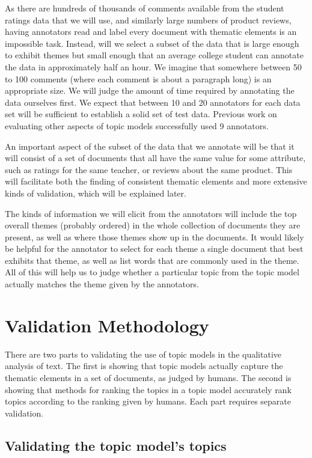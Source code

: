 \documentclass[onecolumn, 11pt]{article}
\begin{document}
As there are hundreds of thousands of comments available from the student
ratings data that we will use, and similarly large numbers of product reviews,
having annotators read and label every document with thematic elements is an
impossible task.  Instead, will we select a subset of the data that is large
enough to exhibit themes but small enough that an average college student can
annotate the data in approximately half an hour.  We imagine that somewhere
between 50 to 100 comments (where each comment is about a paragraph long) is an
appropriate size.  We will judge the amount of time required by annotating the
data ourselves first.  We expect that between 10 and 20 annotators for each
data set will be sufficient to establish a solid set of test data.  Previous
work on evaluating other aspects of topic models successfully used 9
annotators.  

An important aspect of the subset of the data that we annotate will be that it
will consist of a set of documents that all have the same value for some
attribute, such as ratings for the same teacher, or reviews about the same
product.  This will facilitate both the finding of consistent thematic elements
and more extensive kinds of validation, which will be explained later.

The kinds of information we will elicit from the annotators will include the
top overall themes (probably ordered) in the whole collection of documents they
are present, as well as where those themes show up in the documents.  It would
likely be helpful for the annotator to select for each theme a single document
that best exhibits that theme, as well as list words that are commonly used in
the theme.  All of this will help us to judge whether a particular topic from
the topic model actually matches the theme given by the annotators.

\section{Validation Methodology}

There are two parts to validating the use of topic models in the qualitative
analysis of text.  The first is showing that topic models actually capture the
thematic elements in a set of documents, as judged by humans.  The second is
showing that methods for ranking the topics in a topic model accurately rank
topics according to the ranking given by humans.  Each part requires separate
validation.

\subsection{Validating the topic model's topics}
\end{document}
